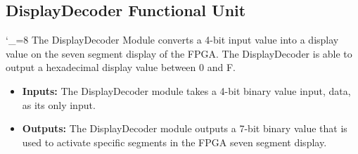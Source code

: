\documentclass[a4paper]{article}
\begin{document}
\subsection{DisplayDecoder Functional Unit}
\catcode`_=8
The DisplayDecoder Module converts a 4-bit input value into a display value on the seven segment display of the FPGA. The DisplayDecoder is able to output a hexadecimal display value between 0 and F.
\begin{itemize}
\item \textbf{Inputs:  } The DisplayDecoder module takes a 4-bit binary value input, data, as its only input.
\item \textbf{Outputs: } The DisplayDecoder module outputs a 7-bit binary value that is used to activate specific segments in the FPGA seven segment display.
\end{itemize}
\clearpage








\clearpage
\end{document}
